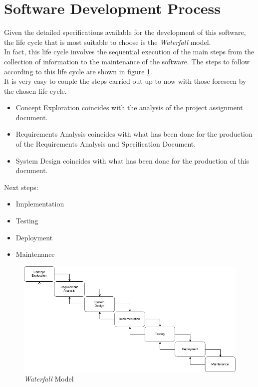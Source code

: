 \section{Software Development Process}
Given the detailed specifications available for the development of this software, the life cycle that is most suitable to choose is the \textit{Waterfall} model.\\
In fact, this life cycle involves the sequential execution of the main steps from the collection of information to the maintenance of the software.
The steps to follow according to this life cycle are shown in figure \ref{img:waterfall}.\\
It is very easy to couple the steps carried out up to now with those foreseen by the chosen life cycle.
\begin{itemize}
  \item Concept Exploration coincides with the analysis of the project assignment document.
  \item Requirements Analysis coincides with what has been done for the production of the Requirements Analysis and Specification Document.
  \item System Design coincides with what has been done for the production of this document.
\end{itemize}
Next steps:
\begin{itemize}
  \item Implementation
  \item Testing
  \item Deployment
  \item Maintenance
\end{itemize}

\begin{figure}[H]
  \begin{center}
  	\includegraphics[width=0.69\paperwidth]{./img/waterfall.png}
    \hspace{0.05\linewidth}
    \centering
    \caption{\textit{Waterfall} Model}
		\label{img:waterfall}
    \end{center}
\end{figure}

